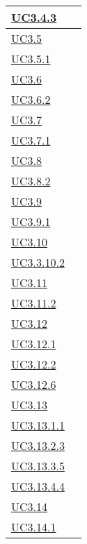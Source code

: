 \begin{longtable}{|P{6cm}|P{6cm}|}
	\hline \hyperref[UC3.4.3]{UC3.4.3} &  \\
	\hline \hyperref[UC3.5]{UC3.5} &  \\
	\hline \hyperref[UC3.5.1]{UC3.5.1} &  \\
	\hline \hyperref[UC3.6]{UC3.6} &  \\
	\hline \hyperref[UC3.6.2]{UC3.6.2} &  \\
	\hline \hyperref[UC3.7]{UC3.7} &  \\
	\hline \hyperref[UC3.7.1]{UC3.7.1} &  \\
	\hline \hyperref[UC3.8]{UC3.8} &  \\
	\hline \hyperref[UC3.8.2]{UC3.8.2} &  \\
	\hline \hyperref[UC3.9]{UC3.9} &  \\
	\hline \hyperref[UC3.9.1]{UC3.9.1} &  \\
	\hline \hyperref[UC3.10]{UC3.10} &  \\
	\hline \hyperref[UC3.10.2]{UC3.3.10.2} &  \\
	\hline \hyperref[UC3.11]{UC3.11} &  \\
	\hline \hyperref[UC3.11.2]{UC3.11.2} &  \\
	\hline \hyperref[UC3.12]{UC3.12} &  \\
	\hline \hyperref[UC3.12.1]{UC3.12.1} &  \\
	\hline \hyperref[UC3.12.2]{UC3.12.2} &  \\
	\hline \hyperref[UC3.12.6]{UC3.12.6} &  \\
	\hline \hyperref[UC3.13]{UC3.13} &  \\
	\hline \hyperref[UC3.13.1.1]{UC3.13.1.1} &  \\
	\hline \hyperref[UC3.13.2.3]{UC3.13.2.3} &  \\
	\hline \hyperref[UC3.13.3.5]{UC3.13.3.5} &  \\
	\hline \hyperref[UC3.13.4.4]{UC3.13.4.4} &  \\
	\hline \hyperref[UC3.14]{UC3.14} &  \\
	\hline \hyperref[UC3.14.1]{UC3.14.1} &  \\

\end{longtable}
